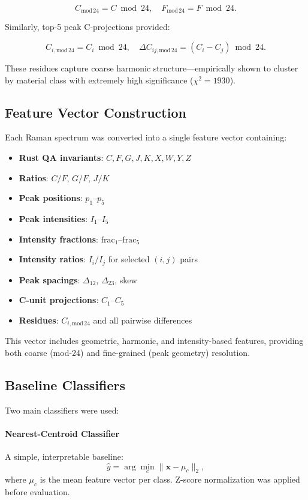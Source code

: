 \documentclass[12pt]{article}
\begin{document}
\[
C_{\mathrm{mod}\,24} = C \bmod 24,\quad 
F_{\mathrm{mod}\,24} = F \bmod 24.
\]

Similarly, top-5 peak C-projections provided:

\[
C_{i,\mathrm{mod}\,24} = C_i \bmod 24,
\quad 
\Delta C_{ij,\mathrm{mod}\,24} = (C_i - C_j) \bmod 24.
\]

These residues capture coarse harmonic structure—empirically shown to cluster by material class with
extremely high significance ($\chi^2 = 1930$).

\subsection{Feature Vector Construction}

Each Raman spectrum was converted into a single feature vector containing:

\begin{itemize}
    \item \textbf{Rust QA invariants}: $C,F,G,J,K,X,W,Y,Z$
    \item \textbf{Ratios}: $C/F$, $G/F$, $J/K$
    \item \textbf{Peak positions}: $p_1$–$p_5$
    \item \textbf{Peak intensities}: $I_1$–$I_5$
    \item \textbf{Intensity fractions}: $\mathrm{frac}_1$–$\mathrm{frac}_5$
    \item \textbf{Intensity ratios}: $I_i/I_j$ for selected $(i,j)$ pairs
    \item \textbf{Peak spacings}: $\Delta_{12}$, $\Delta_{23}$, skew
    \item \textbf{C-unit projections}: $C_1$–$C_5$
    \item \textbf{Residues}: $C_{i,\mathrm{mod}\,24}$ and all pairwise differences
\end{itemize}

This vector includes geometric, harmonic, and intensity-based features, providing both coarse (mod-24) and
fine-grained (peak geometry) resolution.

\subsection{Baseline Classifiers}

Two main classifiers were used:

\paragraph{Nearest-Centroid Classifier}
A simple, interpretable baseline:
\[
\hat{y} = \arg\min_{c} \lVert \mathbf{x} - \mu_{c} \rVert_2,
\]
where $\mu_c$ is the mean feature vector per class.  
Z-score normalization was applied before evaluation.
\end{document}
